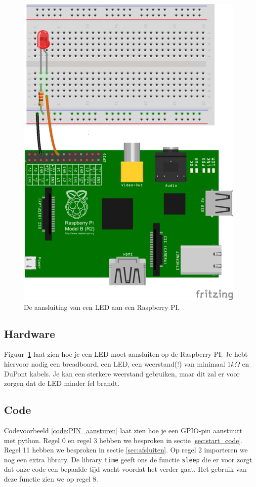 \documentclass{guide}
\begin{document}
\begin{figure}[ht]
\centering
\includegraphics[scale=0.5]{images/PI_and_LED.png}
\caption{De aansluiting van een LED aan een Raspberry PI.} \label{fig:PI_and_LED}
\end{figure}

\subsection{Hardware}
Figuur~\ref{fig:PI_and_LED} laat zien hoe je een LED moet aansluiten op de Raspberry PI. Je hebt hiervoor nodig een breadboard, een LED, een weerstand(!) van minimaal $1k\Omega$ en DuPont kabels. Je kan een sterkere weerstand gebruiken, maar dit zal er voor zorgen dat de LED minder fel brandt.

\subsection{Code}
Codevoorbeeld \ref{code:PIN_aansturen} laat zien hoe je een GPIO-pin aanstuurt met python. Regel 0 en regel 3 hebben we besproken in sectie \ref{sec:start_code}. Regel 11 hebben we besproken in sectie \ref{sec:afsluiten}. Op regel 2 importeren we nog een extra library. De library \texttt{time} geeft ons de functie \texttt{sleep} die er voor zorgt dat onze code een bepaalde tijd wacht voordat het verder gaat. Het gebruik van deze functie zien we op regel 8.
\end{document}
